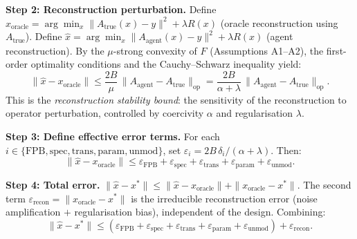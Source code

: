 \documentclass[11pt,a4paper]{article}
\newcommand{\eps}{\varepsilon}
\newcommand{\Atrue}{A_{\text{true}}}
\newcommand{\Aagent}{A_{\text{agent}}}
\begin{document}
\textbf{Step 2: Reconstruction perturbation.}
Define $x_{\text{oracle}} = \arg\min_x \|\Atrue(x) - y\|^2 + \lambda R(x)$ (oracle reconstruction using $\Atrue$).
Define $\hat{x} = \arg\min_x \|\Aagent(x) - y\|^2 + \lambda R(x)$ (agent reconstruction).
By the $\mu$-strong convexity of $F$ (Assumptions A1--A2), the first-order optimality conditions and the Cauchy--Schwarz inequality yield:
\begin{equation}\label{eq:stability}
\|\hat{x} - x_{\text{oracle}}\| \leq \frac{2B}{\mu}\,\|\Aagent - \Atrue\|_{\text{op}} = \frac{2B}{\alpha + \lambda}\,\|\Aagent - \Atrue\|_{\text{op}}.
\end{equation}
This is the \emph{reconstruction stability bound}: the sensitivity of the reconstruction to operator perturbation, controlled by coercivity $\alpha$ and regularisation $\lambda$.

\textbf{Step 3: Define effective error terms.}
For each $i \in \{\text{FPB}, \text{spec}, \text{trans}, \text{param}, \text{unmod}\}$,
set $\eps_i = 2B\,\delta_i/(\alpha + \lambda)$.  Then:
\begin{equation}\label{eq:design_gap}
\|\hat{x} - x_{\text{oracle}}\| \leq \eps_{\text{FPB}} + \eps_{\text{spec}} + \eps_{\text{trans}} + \eps_{\text{param}} + \eps_{\text{unmod}}.
\end{equation}

\textbf{Step 4: Total error.}
$\|\hat{x} - x^*\| \leq \|\hat{x} - x_{\text{oracle}}\| + \|x_{\text{oracle}} - x^*\|$.
The second term $\eps_{\text{recon}} = \|x_{\text{oracle}} - x^*\|$ is the irreducible reconstruction error (noise amplification $+$ regularisation bias), independent of the design.  Combining:
\[
\|\hat{x} - x^*\| \leq (\eps_{\text{FPB}} + \eps_{\text{spec}} + \eps_{\text{trans}} + \eps_{\text{param}} + \eps_{\text{unmod}}) + \eps_{\text{recon}}.
\]
\end{document}
